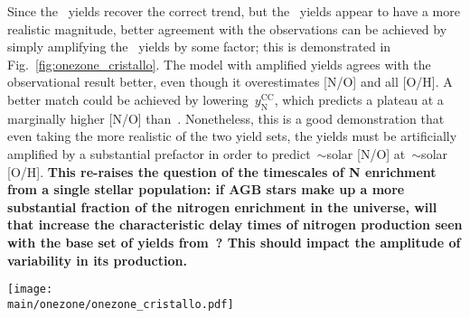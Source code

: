 \documentclass[\main/notes.tex]{subfiles}
\begin{document}
Since the~\citet{Cristallo2011} yields recover the correct trend, but 
the~\citet{Karakas2010} yields appear to have a more realistic magnitude, 
better agreement with the observations can be achieved by simply amplifying 
the~\citet{Cristallo2011} yields by some factor; this is demonstrated in 
Fig.~\ref{fig:onezone_cristallo}. 
The model with amplified yields agrees with the observational result better, 
even though it overestimates [N/O] and all [O/H]. 
A better match could be achieved by lowering~$y_\text{N}^\text{CC}$, which 
predicts a plateau at a marginally higher [N/O] than~\citet*{Henry2000}. 
Nonetheless, this is a good demonstration that even taking the more realistic 
of the two yield sets, the yields must be artificially amplified by a 
substantial prefactor in order to predict~$\sim$solar [N/O] at~$\sim$solar 
[O/H]. 
\textbf{
This re-raises the question of the timescales of N enrichment from a 
single stellar population: if AGB stars make up a more substantial fraction 
of the nitrogen enrichment in the universe, will that increase the 
characteristic delay times of nitrogen production seen with the base set of 
yields from~\citet{Cristallo2011}?
This should impact the amplitude of variability in its production. 
} 

\begin{figure*} 
\texttt{[image: \\main/onezone/onezone\_cristallo.pdf]}
\caption{[N/O]-[O/H] tracks as predicted with the~\citet{Cristallo2011} 
yields (left), and with the same yield set but amplified by a factor of 5 
(right). }
\label{fig:onezone_cristallo} 
\end{figure*} 

\biblio 
\end{document}
